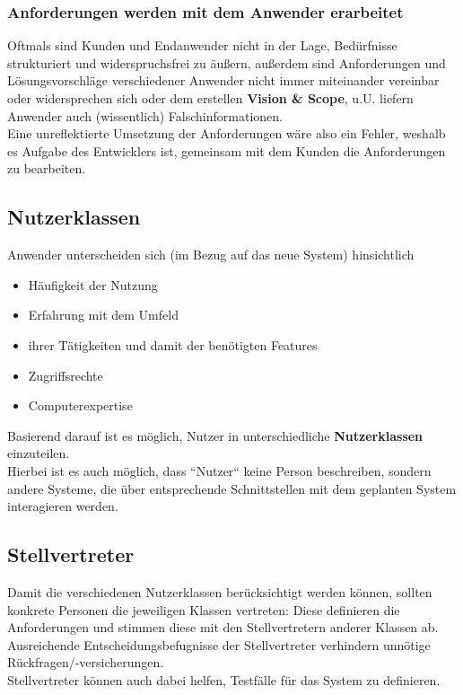 \subsubsection*{Anforderungen werden mit dem Anwender erarbeitet}
Oftmals sind Kunden und Endanwender nicht in der Lage, Bedürfnisse strukturiert und widerspruchsfrei zu äußern, außerdem sind Anforderungen und Lösungsvorschläge verschiedener Anwender nicht immer miteinander vereinbar oder widersprechen sich oder dem erstellen \textbf{Vision \& Scope}, u.U. liefern Anwender auch (wissentlich) Falschinformationen.\\

\noindent
Eine unreflektierte Umsetzung der Anforderungen wäre also ein Fehler, weshalb es Aufgabe des Entwicklers ist, gemeinsam mit dem Kunden die Anforderungen zu bearbeiten.

\subsection*{Nutzerklassen}
Anwender unterscheiden sich (im Bezug auf das neue System) hinsichtlich

\begin{itemize}
    \item Häufigkeit der Nutzung
    \item Erfahrung mit dem Umfeld
    \item ihrer Tätigkeiten und damit der benötigten Features
    \item Zugriffsrechte
    \item Computerexpertise
\end{itemize}

\noindent
Basierend darauf ist es möglich, Nutzer in unterschiedliche \textbf{Nutzerklassen} einzuteilen.\\
Hierbei ist es auch möglich, dass ``Nutzer`` keine Person beschreiben, sondern andere Systeme, die über entsprechende Schnittstellen mit dem geplanten System interagieren werden.

\subsection*{Stellvertreter}
Damit die verschiedenen Nutzerklassen berücksichtigt werden können, sollten konkrete Personen die jeweiligen Klassen vertreten: Diese definieren die Anforderungen und stimmen diese mit den Stellvertretern anderer Klassen ab.\\
Ausreichende Entscheidungsbefugnisse der Stellvertreter verhindern unnötige Rückfragen/-versicherungen.\\
Stellvertreter können auch dabei helfen, Testfälle für das System zu definieren.

